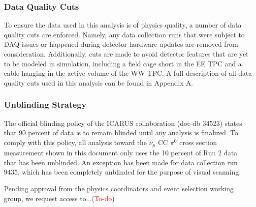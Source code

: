 \documentclass[../main.tex]{subfiles}
\begin{document}
\subsubsection{Data Quality Cuts}
To ensure the data used in this analysis is of physics quality, a number of data quality cuts are enforced.  Namely, any data collection runs that were subject to DAQ issues or happened during detector hardware updates are removed from consideration.  Additionally, cuts are made to avoid detector features that are yet to be modeled in simulation, including a field cage short in the EE TPC and a cable hanging in the active volume of the WW TPC.  A full description of all data quality cuts used in this analysis can be found in Appendix A.

\subsubsection{Unblinding Strategy}
The official blinding policy of the ICARUS collaboration (doc-db 34523) states that 90 percent of data is to remain blinded until any analysis is finalized.  To comply with this policy, all analysis toward the $\nu_{\mu}$ CC $\pi^{0}$ cross section measurement shown in this document only uses the 10 percent of Run 2 data that has been unblinded.  An exception has been made for data collection run 9435, which has been completely unblinded for the purpose of visual scanning.

Pending approval from the physics coordinators and event selection working group, we request access to...(\textcolor{red}{To-do})
\end{document}
